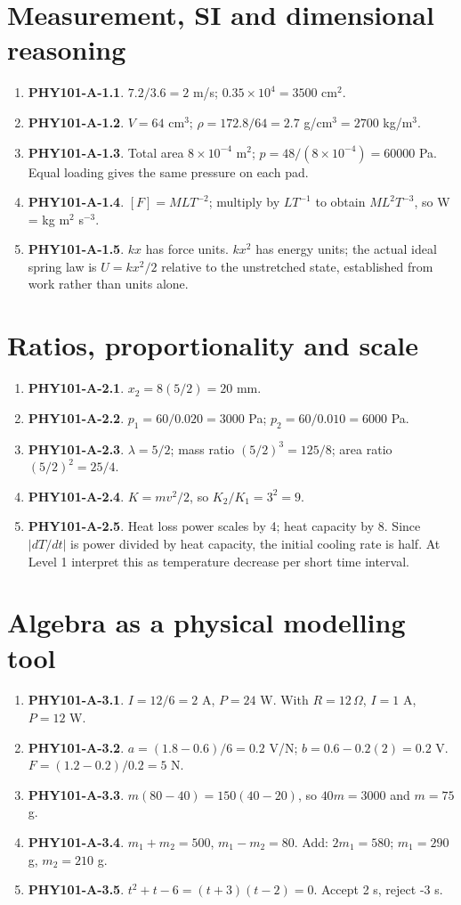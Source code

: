 \documentclass[11pt,a4paper,openany]{book}
\begin{document}
\section{Measurement, SI and dimensional reasoning}
\begin{enumerate}
\item \textbf{PHY101-A-1.1}. $7.2/3.6=2$ m/s; $0.35\times10^4=3500$ cm$^2$.
\item \textbf{PHY101-A-1.2}. $V=64$ cm$^3$; $\rho=172.8/64=2.7$ g/cm$^3=2700$ kg/m$^3$.
\item \textbf{PHY101-A-1.3}. Total area $8\times10^{-4}$ m$^2$; $p=48/(8\times10^{-4})=60000$ Pa. Equal loading gives the same pressure on each pad.
\item \textbf{PHY101-A-1.4}. $[F]=MLT^{-2}$; multiply by $LT^{-1}$ to obtain $ML^2T^{-3}$, so W = kg m$^2$ s$^{-3}$.
\item \textbf{PHY101-A-1.5}. $kx$ has force units. $kx^2$ has energy units; the actual ideal spring law is $U=kx^2/2$ relative to the unstretched state, established from work rather than units alone.
\end{enumerate}
\section{Ratios, proportionality and scale}
\begin{enumerate}
\item \textbf{PHY101-A-2.1}. $x_2=8(5/2)=20$ mm.
\item \textbf{PHY101-A-2.2}. $p_1=60/0.020=3000$ Pa; $p_2=60/0.010=6000$ Pa.
\item \textbf{PHY101-A-2.3}. $\lambda=5/2$; mass ratio $(5/2)^3=125/8$; area ratio $(5/2)^2=25/4$.
\item \textbf{PHY101-A-2.4}. $K=mv^2/2$, so $K_2/K_1=3^2=9$.
\item \textbf{PHY101-A-2.5}. Heat loss power scales by 4; heat capacity by 8. Since $|dT/dt|$ is power divided by heat capacity, the initial cooling rate is half. At Level 1 interpret this as temperature decrease per short time interval.
\end{enumerate}
\section{Algebra as a physical modelling tool}
\begin{enumerate}
\item \textbf{PHY101-A-3.1}. $I=12/6=2$ A, $P=24$ W. With $R=12\,\Omega$, $I=1$ A, $P=12$ W.
\item \textbf{PHY101-A-3.2}. $a=(1.8-0.6)/6=0.2$ V/N; $b=0.6-0.2(2)=0.2$ V. $F=(1.2-0.2)/0.2=5$ N.
\item \textbf{PHY101-A-3.3}. $m(80-40)=150(40-20)$, so $40m=3000$ and $m=75$ g.
\item \textbf{PHY101-A-3.4}. $m_1+m_2=500$, $m_1-m_2=80$. Add: $2m_1=580$; $m_1=290$ g, $m_2=210$ g.
\item \textbf{PHY101-A-3.5}. $t^2+t-6=(t+3)(t-2)=0$. Accept 2 s, reject -3 s.
\end{enumerate}
\end{document}
